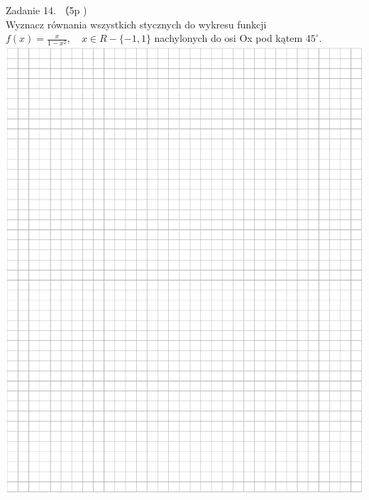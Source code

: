 \documentclass[10pt]{article}
\begin{document}
Zadanie 14. （5p )\\
Wyznacz równania wszystkich stycznych do wykresu funkcji \(f(x)=\frac{x}{1-x^{2}}, \quad x \in R-\{-1,1\}\) nachylonych do osi Ox pod kątem \(45^{\circ}\).\\
\includegraphics[max width=\textwidth, center]{2024_11_21_12a27a32a51fef2c834ag-11}
\end{document}
